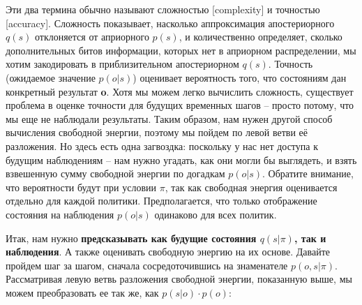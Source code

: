 \documentclass[twoside,leqno, 11pt]{article}
\begin{document}
	Эти два термина обычно называют сложностью [complexity] и точностью [accuracy]. Сложность показывает, насколько аппроксимация апостериорного $q(s)$ отклоняется от априорного $p(s)$, и количественно определяет, сколько дополнительных битов информации, которых нет в априорном распределении, мы хотим закодировать в приблизительном апостериорном $q(s)$. Точность (ожидаемое значение $p(o|s)$) оценивает вероятность того, что состояниям дан конкретный результат \textbf{o}. Хотя мы можем легко вычислить сложность, существует проблема в оценке точности для будущих временных шагов -- просто потому, что мы еще не наблюдали результаты. Таким образом, нам нужен другой способ вычисления свободной энергии, поэтому мы пойдем по левой ветви её разложения. Но здесь есть одна загвоздка: поскольку у нас нет доступа к будущим наблюдениям -- нам нужно угадать, как они могли бы выглядеть, и взять взвешенную сумму свободной энергии по догадкам $p(o|s)$. Обратите внимание, что вероятности будут при условии $\pi$, так как свободная энергия оценивается отдельно для каждой политики. Предполагается, что только отображение состояния на наблюдения $p(o|s)$ одинаково для всех политик.
	
	\begin{figure}[h]	
		\label{ris:image}
	\end{figure}
	
	Итак, нам нужно \textbf{предсказывать как будущие состояния $q(s|\pi)$, так и наблюдения}. А также оценивать свободную энергию на их основе. Давайте пройдем шаг за шагом, сначала сосредоточившись на знаменателе $p(o,s|\pi)$. Рассматривая левую ветвь разложения свободной энергии, показанную выше, мы можем преобразовать ее так же, как $p(s|o) \cdot p(o)$:
	
	
\end{document}
